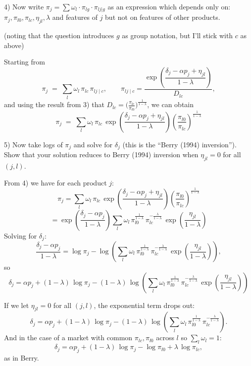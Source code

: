 \documentclass{article}
\begin{document}
\begin{tcolorbox}
4) Now write $\pi_j = \sum \omega_l \cdot \pi_{lg} \cdot \pi_{lj|g}$ as an expression which depends only on: $\pi_j, \pi_{l0},\pi_{lc},\eta_{jl},\lambda$ and features of $j$ but not on features of other products.
\end{tcolorbox}

(noting that the question introduces $g$ as group notation, but I'll stick with $c$ as above)

\vspace{5mm}

Starting from
\[
\pi_j \;=\; \sum_{l} \omega_l\,\pi_{lc}\,\pi_{lj\mid c},
\qquad
\pi_{lj\mid c}
= \frac{\exp\!\left(\dfrac{\delta_j-\alpha p_j+\eta_{jl}}{1-\lambda}\right)}{D_{lc}},
\]
and using the result from 3) that \(D_{lc}=\big(\tfrac{\pi_{lc}}{\pi_{l0}}\big)^{\!\frac{1}{1-\lambda}}\), we can obtain
\[
\;
\pi_j
\;=\;
\sum_{l} \omega_l\,
\pi_{lc}\,
\exp\!\left(\frac{\delta_j-\alpha p_j+\eta_{jl}}{1-\lambda}\right)
\left(\frac{\pi_{l0}}{\pi_{lc}}\right)^{\!\frac{1}{1-\lambda}}
\;
\]


\begin{tcolorbox}
5) Now take logs of $\pi_j$ and solve for $\delta_j$ (this is the ``Berry (1994) inversion''). Show that your solution reduces to Berry (1994) inversion when $\eta_{jl} = 0$ for all $(j,l)$.
\end{tcolorbox}
From 4) we have for each product $j$:
\[
\pi_j
=\sum_{l}\omega_l\,\pi_{lc}\,
\exp\!\left(\frac{\delta_j-\alpha p_j+\eta_{jl}}{1-\lambda}\right)
\left(\frac{\pi_{l0}}{\pi_{lc}}\right)^{\!\frac{1}{1-\lambda}}
\]
\[
=\exp\!\left(\frac{\delta_j-\alpha p_j}{1-\lambda}\right)
\sum_{l}\omega_l\,
\pi_{l0}^{\frac{1}{1-\lambda}}\,
\pi_{lc}^{-\frac{\lambda}{1-\lambda}}\,
\exp\!\left(\frac{\eta_{jl}}{1-\lambda}\right)
\]
Solving for $\delta_j$:
\[
\frac{\delta_j-\alpha p_j}{1-\lambda}
= \log \pi_j
- \log\!\left(
\sum_{l}\omega_l\,
\pi_{l0}^{\frac{1}{1-\lambda}}\,
\pi_{lc}^{-\frac{\lambda}{1-\lambda}}\,
\exp\!\left(\frac{\eta_{jl}}{1-\lambda}\right)
\right),
\]
so
\[
\;
\delta_j
= \alpha p_j
+ (1-\lambda)\,\log \pi_j
- (1-\lambda)\,\log\!\left(
\sum_{l}\omega_l\,
\pi_{l0}^{\frac{1}{1-\lambda}}\,
\pi_{lc}^{-\frac{\lambda}{1-\lambda}}\,
\exp\!\left(\frac{\eta_{jl}}{1-\lambda}\right)
\right)\;
\]

If we let $\eta_{jl}=0$ for all $(j,l)$, the exponential term drops out:
\[
\delta_j
= \alpha p_j
+ (1-\lambda)\,\log \pi_j
- (1-\lambda)\,\log\!\left(
\sum_{l}\omega_l\,
\pi_{l0}^{\frac{1}{1-\lambda}}\,
\pi_{lc}^{-\frac{\lambda}{1-\lambda}}
\right).
\]
And in the case of a market with common $\pi_{lc},\pi_{l0}$ across $l$ so $\sum_l\omega_l=1$:
\[
\delta_j
= \alpha p_j
+ (1-\lambda)\,\log \pi_j
- \log \pi_{l0}
+ \lambda\,\log \pi_{lc},
\]
as in Berry.
\end{document}
